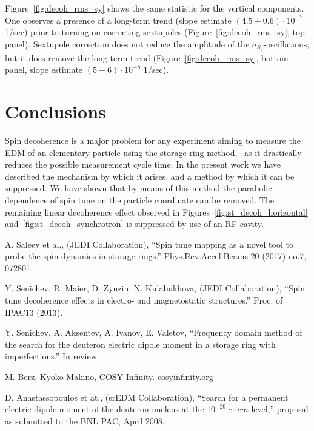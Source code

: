 \documentclass[a4paper]{jacow}
\begin{document}
Figure~\ref{fig:decoh_rms_sy} shows the same statistic for the vertical components. One observes a presence of a long-term trend (slope estimate $(4.5 \pm 0.6)\cdot 10^{-7}$ 1/sec) prior to turning on correcting sextupoles (Figure~\ref{fig:decoh_rms_sy}, top panel). Sextupole correction does not reduce the amplitude of the $\sigma_{S_y}$-oscillations, but it does remove the long-term trend (Figure~\ref{fig:decoh_rms_sy}, bottom panel,
slope estimate $(5 \pm 6) \cdot 10^{-8}$ 1/sec).

\section{Conclusions}
Spin decoherence is a major problem for any experiment aiming to measure the EDM of an elementary particle using the storage ring method,~\cite{BNL:Deuteron2008} as it drastically reduces the possible measurement cycle time. In the present work we have described the mechanism by which it arises, and a method by which it can be suppressed. We have shown that by means of this method the parabolic dependence of spin tune on the particle coordinate can be removed. The remaining linear decoherence effect observed in Figures~\ref{fig:st_decoh_horizontal} and~\ref{fig:st_decoh_synchrotron} is suppressed by use of an RF-cavity.

\begin{thebibliography}{9}
  
  A. Saleev et al., (JEDI Collaboration), ``Spin tune mapping as a novel tool to probe the spin dynamics in storage rings.'' Phys.Rev.Accel.Beams 20 (2017) no.7, 072801

  Y. Senichev, R. Maier, D. Zyuzin, N. Kulabukhova, (JEDI Collaboration), ``Spin tune decoherence effects in electro- and magnetostatic structures.'' Proc. of IPAC13 (2013).

  Y. Senichev, A. Aksentev, A. Ivanov, E. Valetov, ``Frequency domain method of the search for the deuteron electric dipole moment in a storage ring with imperfections.'' In review.

  M. Berz, Kyoko Makino, COSY Infinity. \url{cosyinfinity.org}

  D. Anastassopoulos et at., (srEDM Collaboration), ``Search for a permanent electric dipole moment of the deuteron nucleus at the $10^{-29}~e\cdot cm$ level,'' proposal as submitted to the BNL PAC, April 2008.
  
\end{thebibliography}
\end{document}
